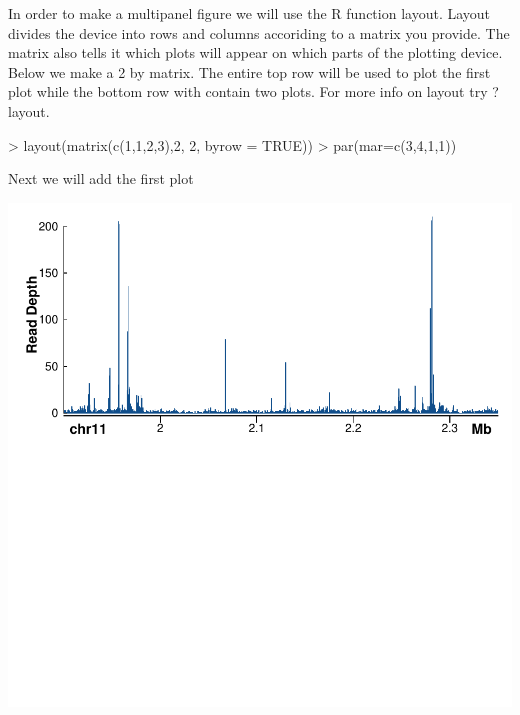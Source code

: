 \documentclass{article}
\begin{document}
In order to make a multipanel figure we will use the R function layout.  Layout divides the device into rows and columns accoriding to a matrix you provide.  The matrix also tells it which plots will appear on which parts of the plotting device.  Below we make a 2 by matrix.  The entire top row will be used to plot the first plot while the bottom row with contain two plots.  For more info on layout try ?layout.

\begin{Schunk}
\begin{Sinput}
> layout(matrix(c(1,1,2,3),2, 2, byrow = TRUE))
> par(mar=c(3,4,1,1))
\end{Sinput}
\end{Schunk}

Next we will add the first plot

\begin{Schunk}
\end{Schunk}


\begin{center}
\includegraphics{Sushi-034}
\end{center}
\end{document}
